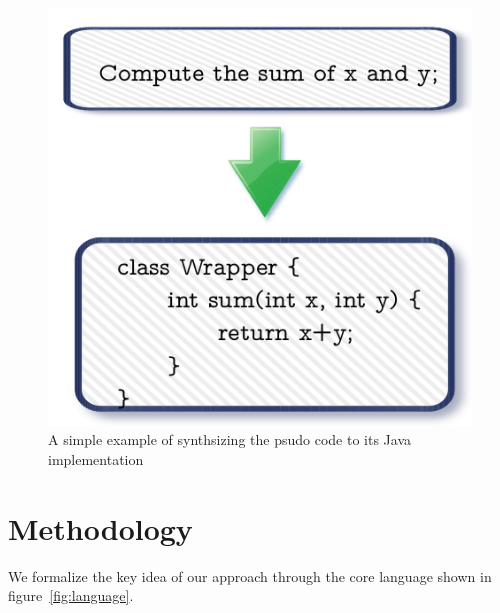 \documentclass[11pt]{article}
\begin{document}
  
\begin{figure}
\centering
\includegraphics[scale=0.3]{convert.png}
\caption{A simple example of synthsizing the psudo code to its Java implementation}\label{fig:convert}
\end{figure}


\section{Methodology}
We formalize the key idea of our approach through the core language shown in
figure~\ref{fig:language}.
\end{document}
